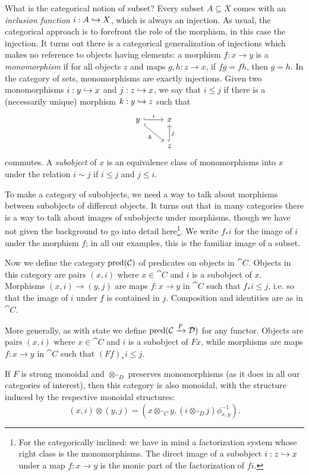 What is the categorical notion of subset? Every subset $A\subseteq X$ comes with
an \emph{inclusion function} $i: A\hookrightarrow X$, which is always an injection. As
usual, the categorical approach is to forefront the role of the morphism, in
this case the injection. It turns out there is a categorical generalization of
injections which makes no reference to objects having elements: a morphism $f:
x\to y$ is a \emph{monomorphism} if for all objects $z$ and maps $g, h: z\to x$,
if $fg = fh$, then $g = h$. In the category of sets, monomorphisms are exactly
injections. Given two monomorphisms $i: y\hookrightarrow x$ and $j: z\hookrightarrow x$, we say that
$i\leq j$ if there is a (necessarily unique) morphism $k: y\hookrightarrow z$ such that \[
  \begin{tikzcd}
    y\ar[hook, r, "i"]\ar[hook, dr, "k"'] & x\\
    & z\ar[hook, u, "j"']
  \end{tikzcd}
\]commutes. A \emph{subobject} of $x$ is an equivalence class of monomorphisms
into $x$ under the relation $i\sim j$ if $i\leq j$ and $j\leq i$.

To make a category of subobjects, we need a way to talk about morphisms between
subobjects of different objects. It turns out that in many categories there is a
way to talk about images of subobjects under morphisms, though we have not given
the background to go into detail here\footnote{For the categorically inclined:
  we have in mind a factorization system whose right class is the monomorphisms.
The direct image of a subobject $i: z\hookrightarrow x$ under a map $f: x\to y$ is the
monic part of the factorization of $fi$.}. We write $f_*i$ for the image of $i$
under the morphism $f$; in all our examples, this is the familiar image of a
subset.

Now we define the category $\operatorname{pred}({\mathcal{C}})$ of predicates on objects in
$\cat{C}$. Objects in this category are pairs $(x, i)$ where $x\in\cat{C}$ and
$i$ is a subobject of $x$. Morphisms $(x, i)\to (y, j)$ are maps $f: x\to y$ in
$\cat{C}$ such that $f_*i\leq j$, i.e. so that the image of $i$ under $f$ is
contained in $j$. Composition and identities are as in $\cat{C}$.

More generally, as with state we define $\operatorname{pred}({\mathcal{C}}\xrightarrow{F}{\mathcal{D}})$ for any
functor. Objects are pairs $(x, i)$ where $x\in\cat{C}$ and $i$ is a subobject
of $Fx$, while morphisms are maps $f: x\to y$ in $\cat{C}$ such that
$(Ff)_*i\leq j$.

If $F$ is strong monoidal and $\otimes_{\cat{D}}$ preserves monomorphisms (as it does in all
our categories of interest), then this category is also monoidal, with the
structure induced by the respective monoidal structures: \[
  (x, i)\otimes (y, j) = (x\otimes_{\cat{C}} y, (i\otimes_{\cat{D}} j)\phi^{-1}_{x,y}).
\]

